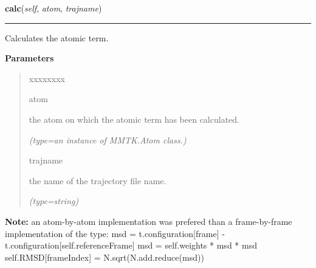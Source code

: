     \label{nMOLDYN:Analysis:Dynamics:RootMeanSquareDeviation:calc}

    \vspace{0.5ex}

\hspace{.8\funcindent}\begin{boxedminipage}{\funcwidth}

    \raggedright \textbf{calc}(\textit{self}, \textit{atom}, \textit{trajname})

    \vspace{-1.5ex}

    \rule{\textwidth}{0.5\fboxrule}
\setlength{\parskip}{2ex}
    Calculates the atomic term.

\setlength{\parskip}{1ex}
      \textbf{Parameters}
      \vspace{-1ex}

      \begin{quote}
        \begin{Ventry}{xxxxxxxx}

          \item[atom]

          the atom on which the atomic term has been calculated.

            {\it (type=an instance of MMTK.Atom class.)}

          \item[trajname]

          the name of the trajectory file name.

            {\it (type=string)}

        \end{Ventry}

      \end{quote}

\textbf{Note:} an atom-by-atom implementation was prefered than a frame-by-frame 
implementation of the type: msd = t.configuration[frame] - 
t.configuration[self.referenceFrame] msd = self.weights * msd * msd 
self.RMSD[frameIndex] = N.sqrt(N.add.reduce(msd))



    \end{boxedminipage}

    \label{nMOLDYN:Analysis:Dynamics:RootMeanSquareDeviation:combine}

